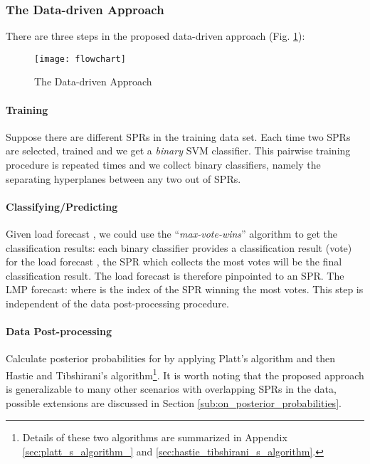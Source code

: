 \documentclass[letterpaper, 11pt]{article}
\theoremstyle{plain}
\theoremstyle{definition}
\begin{document}
\subsubsection{The Data-driven Approach} \label{ssub:extended_data_driven_approach}
There are three steps in the proposed data-driven approach (Fig. \ref{fig:flowchart}):
\begin{figure}[htbp]
  \centering
  \texttt{[image: flowchart]}
  \caption{The Data-driven Approach}
  \label{fig:flowchart}
\end{figure}

\paragraph{Training} \label{par:step_1}
Suppose there are  different SPRs in the training data set. Each time two SPRs are selected, trained and we get a \emph{binary} SVM classifier. This pairwise training procedure is repeated  times and we collect  binary classifiers, namely the  separating hyperplanes between any two out of  SPRs.




\paragraph{Classifying/Predicting} \label{par:step_3}
Given load forecast , we could use the ``\emph{max-vote-wins}'' algorithm to get the classification results:
each binary classifier provides a classification result (vote) for the load forecast , the SPR which collects the most votes will be the final classification result. The load forecast  is therefore pinpointed to an SPR.
The LMP forecast: 
 where  is the index of the SPR winning the most votes. This step is independent of the data post-processing procedure.
\paragraph{Data Post-processing} \label{par:step_2}
Calculate posterior probabilities  for  by applying Platt's algorithm and then Hastie and Tibshirani's algorithm\footnote{Details of these two algorithms are summarized in Appendix \ref{sec:platt_s_algorithm_} and \ref{sec:hastie_tibshirani_s_algorithm}.}.
It is worth noting that the proposed approach is generalizable to many other scenarios with overlapping SPRs in the data, possible extensions are discussed in Section \ref{sub:on_posterior_probabilities}.
\end{document}
